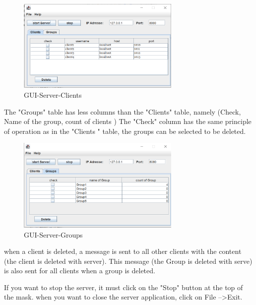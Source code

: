 \begin{figure}
    \centering
    \includegraphics[width=0.7\textwidth]{gfx/GUI_Server_Clients.png}
    \caption{GUI-Server-Clients}
    \label{fig:gui-server-clients}
\end{figure}

\noindent
The "Groups" table has less columns than the "Clients" table, namely (Check, Name of the group, count of clients )
The "Check" column has the same principle of operation as in the "Clients " table,
the groups can be selected to be deleted. 

\begin{figure}
    \centering
    \includegraphics[width=0.7\textwidth]{gfx/GUI_Server_Groups.png}
    \caption{GUI-Server-Groups}
    \label{fig:gui-server-groups}
\end{figure}

\noindent
when a client is deleted, a message is sent to all other clients with the content (the client is deleted with server).
This message (the Group is deleted with serve) is also sent for all clients when a group is deleted. 
\medskip

\noindent
If you want to stop the server, it must click on the "Stop" button at the top of the mask.
when you want to close the server application, click on File -->Exit.
